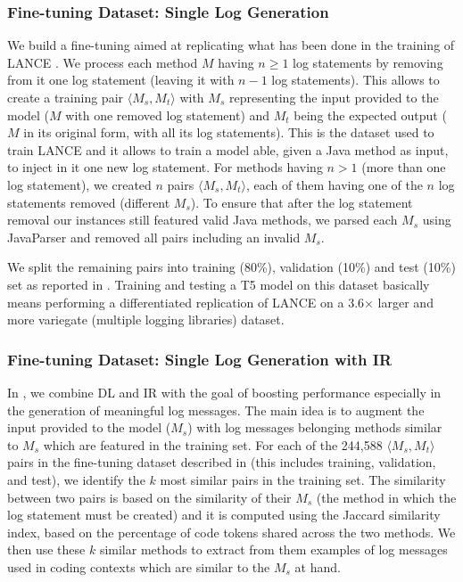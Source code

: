\subsubsection{Fine-tuning Dataset: Single Log Generation} \label{sec:single-log-dataset}
We build a fine-tuning aimed at replicating what has been done in the training of LANCE \cite{mastropaolo2022using}. We process each method $M$ having $n \geq 1$ log statements by removing from it one log statement (\ie leaving it with $n-1$ log statements). This allows to create a training pair $\langle M_s, M_t \rangle$ with $M_s$ representing the input provided to the model (\ie $M$ with one removed log statement) and  $M_t$ being the expected output (\ie $M$ in its original form, with all its log statements). This is the dataset used to train LANCE \cite{mastropaolo2022using} and it allows to train a model able, given a Java method as input, to inject in it one new log statement. For methods having $n > 1$ (\ie more than one log statement), we created $n$ pairs $\langle M_s, M_t \rangle$, each of them having one of the $n$ log statements removed (\ie different $M_s$). To ensure that after the log statement removal our instances still featured valid Java methods, we parsed each $M_s$ using JavaParser \cite{javaparser} and removed all pairs including an invalid $M_s$. 

We split the remaining pairs into training (80\%), validation (10\%) and test (10\%) set as reported in . Training and testing a T5 model on this dataset basically means performing a differentiated replication of LANCE on a 3.6$\times$ larger and more variegate (multiple logging libraries) dataset.

\subsubsection{Fine-tuning Dataset: Single Log Generation with IR} \label{sec:single-log-plus-IR}

In \approach, we combine DL and IR with the goal of boosting performance especially in the generation of meaningful log messages. The main idea is to augment the input provided to the model (\ie $M_{s}$) with log messages belonging methods similar to $M_{s}$ which are featured in the training set. For each of the 244,588 $\langle M_s, M_t \rangle$ pairs in the fine-tuning dataset described in  (this includes training, validation, and test), we identify the $k$ most similar pairs in the training set. The similarity between two pairs is based on the similarity of their $M_s$ (\ie the method in which the log statement must be created) and it is computed using the Jaccard similarity \cite{hancock2004jaccard} index, based on the percentage of code tokens shared across the two methods. We then use these $k$ similar methods to extract from them examples of log messages used in coding contexts which are similar to the $M_s$ at hand. 

